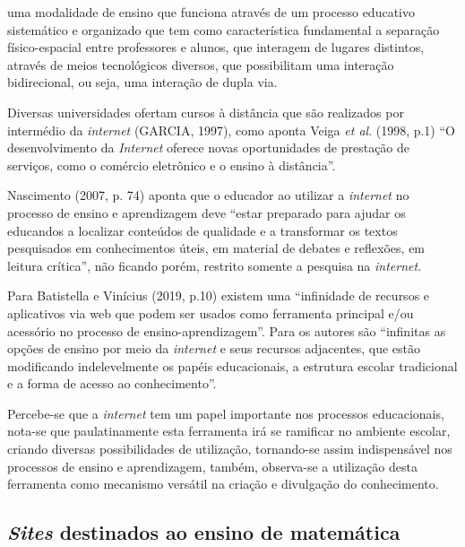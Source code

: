 \documentclass{IFNMG}
\begin{document}
\begin{CitacaoLonga} 
uma modalidade de ensino que funciona através de um processo educativo sistemático e organizado que tem como característica fundamental a separação físico-espacial entre professores e alunos, que interagem de lugares distintos, através de meios tecnológicos diversos, que possibilitam uma interação bidirecional, ou seja, uma interação de dupla via.
\end{CitacaoLonga}

Diversas universidades ofertam cursos à distância que são realizados por intermédio da \textit{internet} (GARCIA, 1997), como aponta Veiga \textit{et al}. (1998, p.1) “O desenvolvimento da \textit{Internet} oferece novas oportunidades de prestação de serviços, como o comércio eletrônico e o ensino à distância”.

Nascimento (2007, p. 74) aponta que o educador ao utilizar a \textit{internet} no processo de ensino e aprendizagem deve “estar preparado para ajudar os educandos a localizar conteúdos de qualidade e a transformar os textos pesquisados em conhecimentos úteis, em material de debates e reflexões, em leitura crítica”, não ficando porém, restrito somente a pesquisa na \textit{internet}.

Para Batistella e Vinícius (2019, p.10) existem uma “infinidade de recursos e aplicativos via web que podem ser usados como ferramenta principal e/ou acessório no processo de ensino-aprendizagem”. Para os autores são “infinitas as opções de ensino por meio da \textit{internet} e seus recursos adjacentes, que estão modificando indelevelmente os papéis educacionais, a estrutura escolar tradicional e a forma de acesso ao conhecimento”.

Percebe-se que a \textit{internet} tem um papel importante nos processos educacionais, nota-se que paulatinamente esta ferramenta irá se ramificar no ambiente escolar, criando diversas possibilidades de utilização, tornando-se assim indispensável nos processos de ensino e aprendizagem, também, observa-se a utilização desta ferramenta como mecanismo versátil na criação e divulgação do conhecimento.


\subsection{\textit{Sites} destinados ao ensino de matemática}
\end{document}
